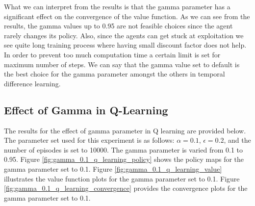 \documentclass{assignment}
\begin{document}
What we can interpret from the results is that the gamma parameter has a significant effect on the convergence of the value function. As we can see from the results, the gamma values up to 0.95 are not feasible choices since the agent rarely changes its policy. Also, since the agents can get stuck at exploitation we see quite long training process where having small discount factor does not help. In order to prevent too much computation time a certain limit is set for maximum number of steps. We can say that the gamma value set to default is the best choice for the gamma parameter amongst the others in temporal difference learning.  

\subsection{Effect of Gamma in Q-Learning}
The results for the effect of gamma parameter in Q learning are provided below. The parameter set used for this experiment is as follows: $\alpha = 0.1$, $\epsilon = 0.2$, and the number of episodes is set to 10000. The gamma parameter is varied from 0.1 to 0.95.
Figure \ref{fig:gamma_0.1_q_learning_policy} shows the policy maps for the gamma parameter set to 0.1. Figure \ref{fig:gamma_0.1_q_learning_value} illustrates the value function plots for the gamma parameter set to 0.1. Figure \ref{fig:gamma_0.1_q_learning_convergence} provides the convergence plots for the gamma parameter set to 0.1.
\end{document}
